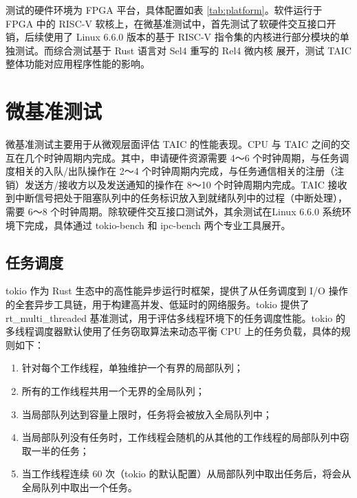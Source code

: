 测试的硬件环境为 FPGA 平台，具体配置如表 \ref{tab:platform}。软件运行于 FPGA 中的 RISC-V 软核上，在微基准测试中，首先测试了软硬件交互接口开销，后续使用了 Linux 6.6.0 版本的基于 RISC-V 指令集的内核进行部分模块的单独测试。而综合测试基于 Rust 语言对 Sel4 \cite{sel4_2025} 重写的 Rel4 微内核 \cite{rel4_kernel} 展开，测试 TAIC 整体功能对应用程序性能的影响。

\section{微基准测试}

微基准测试主要用于从微观层面评估 TAIC 的性能表现。CPU 与 TAIC 之间的交互在几个时钟周期内完成。其中，申请硬件资源需要 4～6 个时钟周期，与任务调度相关的入队/出队操作在 2～4 个时钟周期内完成，与任务通信相关的注册（注销）发送方/接收方以及发送通知的操作在 8～10 个时钟周期内完成。TAIC 接收到中断信号把处于阻塞队列中的任务标识放入到就绪队列中的过程（中断处理），需要 6～8 个时钟周期。除软硬件交互接口测试外，其余测试在Linux 6.6.0 系统环境下完成，具体通过 tokio-bench 和 ipc-bench 两个专业工具展开。

\subsection{任务调度}

tokio \cite{tokio} 作为 Rust 生态中的高性能异步运行时框架，提供了从任务调度到 I/O 操作的全套异步工具链，用于构建高并发、低延时的网络服务。tokio 提供了 rt\_multi\_threaded 基准测试，用于评估多线程环境下的任务调度性能。tokio 的多线程调度器默认使用了任务窃取算法来动态平衡 CPU 上的任务负载，具体的规则如下：

\begin{enumerate}
    \item 针对每个工作线程，单独维护一个有界的局部队列；
    \item 所有的工作线程共用一个无界的全局队列；
    \item \label{item:push_overflow} 当局部队列达到容量上限时，任务将会被放入全局队列中；
    \item \label{item:steal_work}当局部队列没有任务时，工作线程会随机的从其他的工作线程的局部队列中窃取一半的任务；
    \item 当工作线程连续 60 次（tokio 的默认配置）从局部队列中取出任务后，将会从全局队列中取出一个任务。
\end{enumerate}


